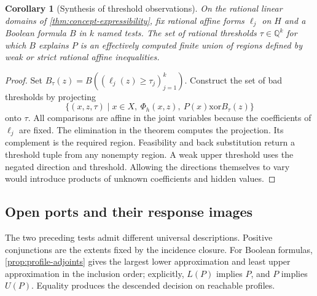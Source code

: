 \documentclass[11pt,a4paper]{article}
\newtheorem{corollary}[corollary]{Corollary}
\theoremstyle{definition}
\theoremstyle{remark}\newaliascnt{remark}{theorem}
\newcommand{\Q}{\mathbb Q}
\numberwithin{equation}{section}
\begin{document}
\begin{corollary}[Synthesis of threshold observations]\label{cor:concept-thresholds}
On the rational linear domains of \cref{thm:concept-expressibility}, fix rational affine forms $\ell_j$ on $H$ and a Boolean formula $B$ in $k$ named tests. The set of rational thresholds $\tau\in\Q^k$ for which $B$ explains $P$ is an effectively computed finite union of regions defined by weak or strict rational affine inequalities.
\end{corollary}
\begin{proof}
Set $B_\tau(z)=B((\ell_j(z)\ge\tau_j)_{j=1}^k)$. Construct the set of bad thresholds by projecting
\[
 \{(x,z,\tau)\mid x\in X,\ \Phi_h(x,z),\
                 P(x)\mathbin{\mathrm{xor}}B_\tau(z)\}
\]
onto $\tau$. All comparisons are affine in the joint variables because the coefficients of $\ell_j$ are fixed. The elimination in the theorem computes the projection. Its complement is the required region. Feasibility and back substitution return a threshold tuple from any nonempty region. A weak upper threshold uses the negated direction and threshold. Allowing the directions themselves to vary would introduce products of unknown coefficients and hidden values.
\end{proof}

\subsection{Open ports and their response images}
The two preceding tests admit different universal descriptions. Positive conjunctions are the extents fixed by the incidence closure. For Boolean formulas, \cref{prop:profile-adjoints} gives the largest lower approximation and least upper approximation in the inclusion order; explicitly, \(L(P)\) implies \(P\), and \(P\) implies \(U(P)\). Equality produces the descended decision on reachable profiles.
\end{document}
